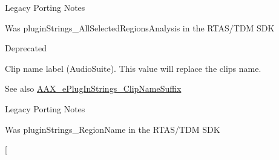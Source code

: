 \begin{Desc}
\begin{description}
\begin{DoxyRefDesc}{Legacy Porting Notes}
\item[\hyperlink{a00384__porting_notes000016}{Legacy Porting Notes}]Was plugin\+Strings\+\_\+\+All\+Selected\+Regions\+Analysis in the R\+T\+A\+S/\+T\+D\+M S\+D\+K \end{DoxyRefDesc}
\item[{\em 
\hypertarget{a00206_a86f7310877399d9d4d2ea4863d472476a8303f835e7a2fc8847717db5e69064ac}{}A\+A\+X\+\_\+e\+Plug\+In\+Strings\+\_\+\+Region\+Name\label{a00206_a86f7310877399d9d4d2ea4863d472476a8303f835e7a2fc8847717db5e69064ac}
}]\begin{DoxyRefDesc}{Deprecated}
\item[\hyperlink{a00386__deprecated000006}{Deprecated}]\end{DoxyRefDesc}
\item[{\em 
\hypertarget{a00206_a86f7310877399d9d4d2ea4863d472476ab33b745bc2c47f9c95bad0125ff6c816}{}A\+A\+X\+\_\+e\+Plug\+In\+Strings\+\_\+\+Clip\+Name\label{a00206_a86f7310877399d9d4d2ea4863d472476ab33b745bc2c47f9c95bad0125ff6c816}
}]Clip name label (Audio\+Suite). This value will replace the clip\textquotesingle{}s name. \begin{DoxySeeAlso}{See also}
\hyperlink{a00206_a86f7310877399d9d4d2ea4863d472476ac2ad5da7b876541a94ca9471193b7195}{A\+A\+X\+\_\+e\+Plug\+In\+Strings\+\_\+\+Clip\+Name\+Suffix}
\end{DoxySeeAlso}
\begin{DoxyRefDesc}{Legacy Porting Notes}
\item[\hyperlink{a00384__porting_notes000017}{Legacy Porting Notes}]Was plugin\+Strings\+\_\+\+Region\+Name in the R\+T\+A\+S/\+T\+D\+M S\+D\+K \end{DoxyRefDesc}
\item[{\em 
}
\end{description}
\end{Desc}
